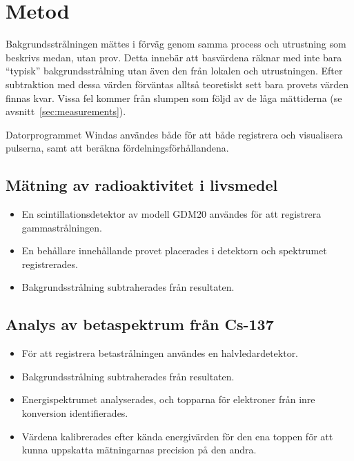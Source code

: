 \section{Metod} \label{sec:method}

Bakgrundsstrålningen mättes i förväg genom samma process och utrustning som
beskrivs medan, utan prov. Detta innebär att basvärdena räknar med inte bara
``typisk'' bakgrundsstrålning utan även den från lokalen och utrustningen.
Efter subtraktion med dessa värden förväntas alltså teoretiskt sett bara
provets värden finnas kvar. Vissa fel kommer från slumpen som följd av de låga
mättiderna (se avsnitt~\ref{sec:measurements}).

Datorprogrammet Windas användes både för att både registrera och visualisera
pulserna, samt att beräkna fördelningsförhållandena.

\subsection{Mätning av radioaktivitet i livsmedel}

\begin{itemize}
    \item En scintillationsdetektor av modell GDM20 användes för att registrera
    gammastrålningen.

    \item En behållare innehållande provet placerades i detektorn och
    spektrumet registrerades.

    \item Bakgrundsstrålning subtraherades från resultaten.
\end{itemize}

\subsection{Analys av betaspektrum från Cs-137}

\begin{itemize}
    \item För att registrera betastrålningen användes en halvledardetektor.

    \item Bakgrundsstrålning subtraherades från resultaten.

    \item Energispektrumet analyserades, och topparna för elektroner från inre 
    konversion identifierades.

    \item Värdena kalibrerades efter kända energivärden för den ena toppen för
    att kunna uppskatta mätningarnas precision på den andra.
\end{itemize}
